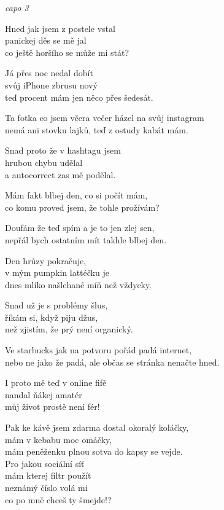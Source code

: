 
\re{}
\textit{capo 3}

\ve{}
Hned jak jsem z postele vstal\\
panickej děs se mě jal\\
co ještě horšího se může mi stát?

Já přes noc nedal dobít\\
svůj iPhone zbrusu nový\\
teď procent mám jen něco přes šedesát.

Ta fotka co jsem včera večer házel na svůj instagram\\
nemá ani stovku lajků, teď z ostudy kabát mám.

Snad proto že v hashtagu jsem\\
hrubou chybu udělal\\
a autocorrect zas mě podělal.

\cho{}
Mám fakt blbej den, co si počít mám,\\
co komu proved jsem, že tohle prožívám? 

Doufám že teď spím a je to jen zlej sen,\\
nepřál bych ostatním mít takhle blbej den. 

\ve{}
Den hrůzy pokračuje,\\
v mým pumpkin lattéčku je\\
dnes mlíko našlehané míň než vždycky.

Snad už je s problémy šlus,\\
říkám si, když piju džus,\\
než zjistím, že prý není organický.

Ve starbucks jak na potvoru pořád padá internet,\\
nebo ne jako že padá, ale občas se stránka nenačte hned.

I proto mě teď v online fifě\\
nandal ňákej amatér\\
můj život prostě není fér!

\cho{}

\ve{}
Pak ke kávě jsem zdarma dostal okoralý koláčky,\\
mám v kebabu moc omáčky,\\
mám peněženku plnou sotva do kapsy se vejde.\\
Pro jakou sociální síť\\
mám kterej filtr použít\\
neznámý číslo volá mi\\
co po mně chceš ty šmejde!?

